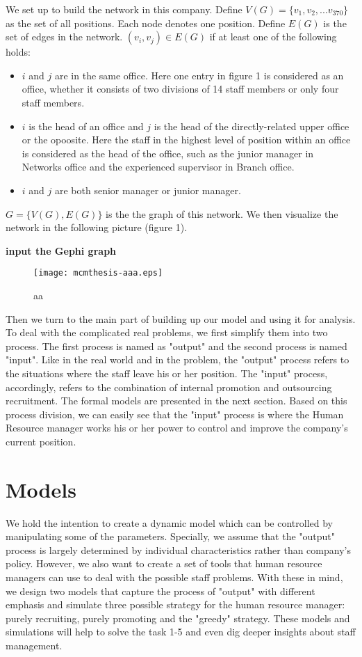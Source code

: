 \documentclass[tcn = 37075, sheet = true, abstract = true]{mcmthesis}
\begin{document}
We set up to build the network in this company. Define $V(G)=\{v_1,v_2,...v_{370}\}$ as the set of all positions. Each node denotes one position. Define $E(G)$ is the set of edges in the network. $(v_i,v_j)\in E(G)$ if at least one of the following holds:


\begin{itemize}
\item $i$ and $j$ are in the same office. Here one entry in figure 1 is considered as an office, whether it consists of two divisions of 14 staff members or only four staff members.
\item $i$ is the head of an office and $j$ is the head of the directly-related upper office or the opoosite. Here the staff in the highest level of position within an office is considered as the head of the office, such as the junior manager in Networks office and the experienced supervisor in Branch office.
\item $i$ and $j$ are both senior manager or junior manager.
\end{itemize}

$G=\{V(G),E(G)\}$ is the the graph of this network. We then visualize the network in the following picture (figure 1).

\textbf{input the Gephi graph}

\begin{figure}[htb!]
\small
\centering
\texttt{[image: mcmthesis-aaa.eps]}
\caption{aa} \label{fig:aa}
\end{figure}

Then we turn to the main part of building up our model and using it for analysis. To deal with the complicated real problems, we first simplify them into two process. The first process is named as "output" and the second process is named "input". Like in the real world and in the problem, the "output" process refers to the situations where the staff leave his or her position. The "input" process, accordingly, refers to the combination of internal promotion and outsourcing recruitment. The formal models are presented in the next section. Based on this process division, we can easily see that the "input" process is where the Human Resource manager works his or her power to control and improve the company's current position.


\section{Models}

We hold the intention to create a dynamic model which can be controlled by manipulating some of the parameters. Specially, we assume that the "output" process is largely determined by individual characteristics rather than company's policy. However, we also want to create a set of tools that human resource managers can use to deal with the possible staff problems. With these in mind, we design two models that capture the process of "output" with different emphasis and simulate three possible strategy for the human resource manager: purely recruiting, purely promoting and the "greedy" strategy. These models and simulations will help to solve the task 1-5 and even dig deeper insights about staff management. 
\end{document}
